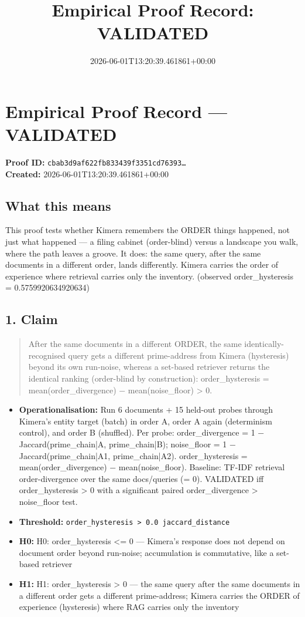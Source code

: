 \documentclass{article}
\title{Empirical Proof Record: VALIDATED}
\date{2026-06-01T13:20:39.461861+00:00}
\begin{document}
\maketitle
\section*{Empirical Proof Record --- \textcolor{validated}{\textbf{VALIDATED}}}
\textbf{Proof ID:} \texttt{cbab3d9af622fb833439f3351cd76393\dots}\\
\textbf{Created:} 2026-06-01T13:20:39.461861+00:00
\subsection*{What this means}
This proof tests whether Kimera remembers the ORDER things happened, not just what happened — a filing cabinet (order-blind) versus a landscape you walk, where the path leaves a groove. It does: the same query, after the same documents in a different order, lands differently. Kimera carries the order of experience where retrieval carries only the inventory. (observed order\_hysteresis = 0.5759920634920634)
\subsection*{1. Claim}
\begin{quote}After the same documents in a different ORDER, the same identically-recognised query gets a different prime-address from Kimera (hysteresis) beyond its own run-noise, whereas a set-based retriever returns the identical ranking (order-blind by construction): order\_hysteresis = mean(order\_divergence) − mean(noise\_floor) > 0.\end{quote}
\begin{itemize}
\item \textbf{Operationalisation:} Run 6 documents + 15 held-out probes through Kimera's entity target (batch) in order A, order A again (determinism control), and order B (shuffled). Per probe: order\_divergence = 1 − Jaccard(prime\_chain|A, prime\_chain|B); noise\_floor = 1 − Jaccard(prime\_chain|A1, prime\_chain|A2). order\_hysteresis = mean(order\_divergence) − mean(noise\_floor). Baseline: TF-IDF retrieval order-divergence over the same docs/queries (= 0). VALIDATED iff order\_hysteresis > 0 with a significant paired order\_divergence > noise\_floor test.
\item \textbf{Threshold:} \texttt{order\_hysteresis > 0.0 jaccard\_distance}
\item \textbf{H0:} H0: order\_hysteresis <= 0 — Kimera's response does not depend on document order beyond run-noise; accumulation is commutative, like a set-based retriever
\item \textbf{H1:} H1: order\_hysteresis > 0 — the same query after the same documents in a different order gets a different prime-address; Kimera carries the ORDER of experience (hysteresis) where RAG carries only the inventory
\end{itemize}
\end{document}
